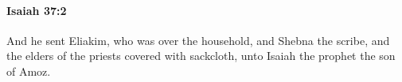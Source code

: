 
		\paragraph{Isaiah 37:2} %
			\label{ISAIAH-37-2}

			And he sent Eliakim, who was over the household, and Shebna the scribe, and the elders of the priests covered with sackcloth, unto Isaiah the prophet the son of Amoz.


